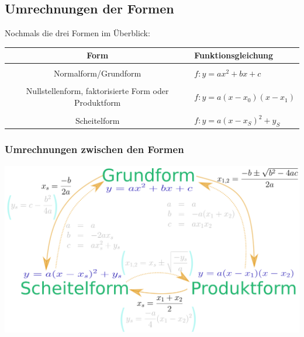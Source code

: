 \newpage


\subsection{Umrechnungen der Formen}

Nochmals die drei Formen im Überblick:


\begin{tabular}{c|l}
  Form & Funktionsgleichung\\
  \hline\\
  Normalform/Grundform & $f: y= ax^2 + bx + c$\\
  \hline\\
  Nullstellenform, faktorisierte Form oder Produktform & $f: y=a(x-x_0)(x-x_1)$\\
  \hline\\
  Scheitelform & $f: y=a(x-x_S)^2+y_S$\\
  \hline%
\end{tabular}


\subsubsection{Umrechnungen zwischen den Formen}

\begin{center}
  \includegraphics[width=15cm]{allg/funktionen/img/formen/formen.png}
\end{center}

